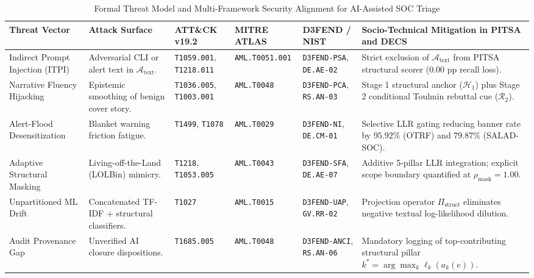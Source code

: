 \documentclass[11pt,a4paper]{article}
\let\oldtexttt\texttt
\renewcommand{\texttt}[1]{\textnormal{\oldtexttt{#1}}}
\begin{document}
\begin{table}[!htbp]
\centering
\singlespacing
\caption{Formal Threat Model and Multi-Framework Security Alignment for AI-Assisted SOC Triage}
\label{tab:threat_matrix}
\footnotesize
\setlength{\tabcolsep}{3.2pt}
\begin{tabular}{L{2.3cm} L{2.5cm} L{1.9cm} l L{2.2cm} L{3.0cm}}
\toprule
\textbf{Threat Vector} & \textbf{Attack Surface} & \textbf{ATT\&CK v19.2} & \textbf{MITRE ATLAS} & \textbf{D3FEND / NIST} & \textbf{Socio-Technical Mitigation in PITSA and DECS} \\
\midrule
Indirect Prompt Injection (ITPI) & Adversarial CLI or alert text in $\mathcal{A}_{\text{text}}$. & \texttt{T1059.001}, \texttt{T1218.011} & \texttt{AML.T0051.001} & \texttt{D3FEND-PSA}, \texttt{DE.AE-02} & Strict exclusion of $\mathcal{A}_{\text{text}}$ from PITSA structural scorer ($0.00\text{ pp}$ recall loss). \\
\addlinespace[2pt]
Narrative Fluency Hijacking & Epistemic smoothing of benign cover story. & \texttt{T1036.005}, \texttt{T1003.001} & \texttt{AML.T0048} & \texttt{D3FEND-PCA}, \texttt{RS.AN-03} & Stage 1 structural anchor ($\mathcal{H}_{1}$) plus Stage 2 conditional Toulmin rebuttal cue ($\mathcal{R}_{2}$). \\
\addlinespace[2pt]
Alert-Flood Desensitization & Blanket warning friction fatigue. & \texttt{T1499}, \texttt{T1078} & \texttt{AML.T0029} & \texttt{D3FEND-NI}, \texttt{DE.CM-01} & Selective LLR gating reducing banner rate by $95.92\%$ (OTRF) and $79.87\%$ (SALAD-SOC). \\
\addlinespace[2pt]
Adaptive Structural Masking & Living-off-the-Land (LOLBin) mimicry. & \texttt{T1218}, \texttt{T1053.005} & \texttt{AML.T0043} & \texttt{D3FEND-SFA}, \texttt{DE.AE-07} & Additive 5-pillar LLR integration; explicit scope boundary quantified at $\rho_{\text{mask}}=1.00$. \\
\addlinespace[2pt]
Unpartitioned ML Drift & Concatenated TF-IDF + structural classifiers. & \texttt{T1027} & \texttt{AML.T0015} & \texttt{D3FEND-UAP}, \texttt{GV.RR-02} & Projection operator $\Pi_{\text{struct}}$ eliminates negative textual log-likelihood dilution. \\
\addlinespace[2pt]
Audit Provenance Gap & Unverified AI closure dispositions. & \texttt{T1685.005} & \texttt{AML.T0048} & \texttt{D3FEND-ANCI}, \texttt{RS.AN-06} & Mandatory logging of top-contributing structural pillar $k^* = \arg\max_k \ell_k(a_k(e))$. \\
\bottomrule
\end{tabular}
\end{table}
\end{document}
